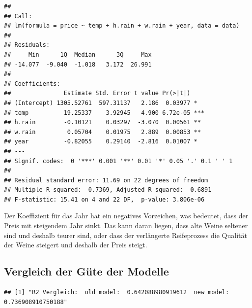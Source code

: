 \documentclass[]{article}
\newenvironment{Shaded}{\begin{snugshade}}{\end{snugshade}}
\newcommand{\KeywordTok}[1]{\textcolor[rgb]{0.13,0.29,0.53}{\textbf{#1}}}
\newcommand{\NormalTok}[1]{#1}
\newcommand{\OperatorTok}[1]{\textcolor[rgb]{0.81,0.36,0.00}{\textbf{#1}}}
\newcommand{\StringTok}[1]{\textcolor[rgb]{0.31,0.60,0.02}{#1}}
\begin{document}
\begin{verbatim}
## 
## Call:
## lm(formula = price ~ temp + h.rain + w.rain + year, data = data)
## 
## Residuals:
##     Min      1Q  Median      3Q     Max 
## -14.077  -9.040  -1.018   3.172  26.991 
## 
## Coefficients:
##               Estimate Std. Error t value Pr(>|t|)    
## (Intercept) 1305.52761  597.31137   2.186  0.03977 *  
## temp          19.25337    3.92945   4.900 6.72e-05 ***
## h.rain        -0.10121    0.03297  -3.070  0.00561 ** 
## w.rain         0.05704    0.01975   2.889  0.00853 ** 
## year          -0.82055    0.29140  -2.816  0.01007 *  
## ---
## Signif. codes:  0 '***' 0.001 '**' 0.01 '*' 0.05 '.' 0.1 ' ' 1
## 
## Residual standard error: 11.69 on 22 degrees of freedom
## Multiple R-squared:  0.7369, Adjusted R-squared:  0.6891 
## F-statistic: 15.41 on 4 and 22 DF,  p-value: 3.806e-06
\end{verbatim}

Der Koeffizient für das Jahr hat ein negatives Vorzeichen, was bedeutet, dass der Preis mit steigendem Jahr sinkt.
Das kann daran liegen, dass alte Weine seltener sind und deshalb teurer sind, oder dass der verlängerte Reifeprozess
die Qualität der Weine steigert und deshalb der Preis steigt.

\hypertarget{vergleich-der-guxfcte-der-modelle}{%
\subsection{Vergleich der Güte der Modelle}\label{vergleich-der-guxfcte-der-modelle}}

\begin{Shaded}
\end{Shaded}

\begin{verbatim}
## [1] "R2 Vergleich:  old model:  0.642088980919612  new model:  0.736908910750188"
\end{verbatim}

\begin{Shaded}
\end{Shaded}
\end{document}
